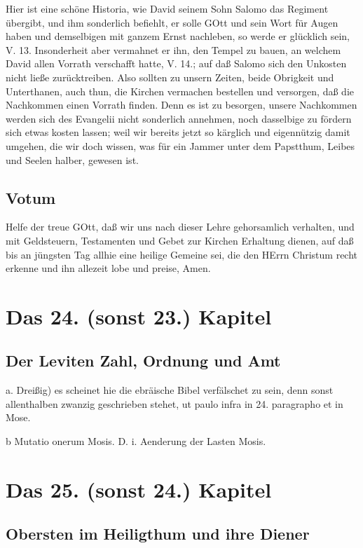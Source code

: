 Hier ist eine schöne Historia, wie David seinem Sohn Salomo das Regiment übergibt, und ihm sonderlich befiehlt, er solle GOtt und sein Wort für Augen haben und demselbigen mit ganzem Ernst nachleben, so werde er glücklich sein, V. 13. Insonderheit aber vermahnet er ihn, den Tempel zu bauen, an welchem David allen Vorrath verschafft hatte, V. 14.; auf daß Salomo sich den Unkosten nicht ließe zurücktreiben. Also sollten zu unsern Zeiten, beide Obrigkeit und Unterthanen, auch thun, die Kirchen vermachen bestellen und versorgen, daß die Nachkommen einen Vorrath finden. Denn es ist zu besorgen, unsere Nachkommen werden sich des Evangelii nicht sonderlich annehmen, noch dasselbige zu fördern sich etwas kosten lassen; weil wir bereits jetzt so kärglich und eigennützig damit umgehen, die wir doch wissen, was für ein Jammer unter dem Papstthum, Leibes und Seelen halber, gewesen ist.

\section{Votum}

Helfe der treue GOtt, daß wir uns nach dieser Lehre gehorsamlich verhalten, und mit Geldsteuern, Testamenten und Gebet zur Kirchen Erhaltung dienen, auf daß bis an jüngsten Tag allhie eine heilige Gemeine sei, die den HErrn Christum recht erkenne und ihn allezeit lobe und preise, Amen.

\chapter{Das 24. (sonst 23.) Kapitel}

\section[Der Leviten Zahl, Ordnung und Amt]{Der Leviten Zahl, Ordnung und Amt}

a. Dreißig) es scheinet hie die ebräische Bibel verfälschet zu sein, denn sonst allenthalben zwanzig geschrieben stehet, ut paulo infra in 24. paragrapho et in Mose.


b Mutatio onerum Mosis. D. i. Aenderung der Lasten Mosis.

\chapter{Das 25. (sonst 24.) Kapitel}

\section[Obersten im Heiligthum und ihre Diener]{Obersten im Heiligthum und ihre Diener}

